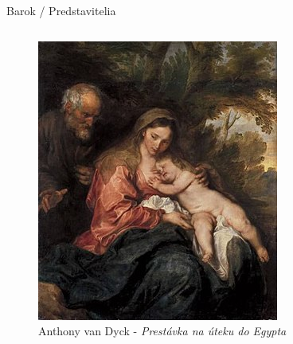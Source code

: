 \documentclass[dvipsnames]{beamer}
\begin{document}
\begin{frame}{\small \textcolor{g}{Barok} / \Large Predstavitelia}
\begin{columns}
		\begin{figure}

			\includegraphics[scale=0.275]{oddych}
			\vskip 1mm
			\caption{\centering \textcolor{BurntOrange}{Anthony van Dyck} - \textit{Prestávka na úteku do Egypta}}
		\end{figure}
	\end{columns}
		
\end{frame}
\end{document}
